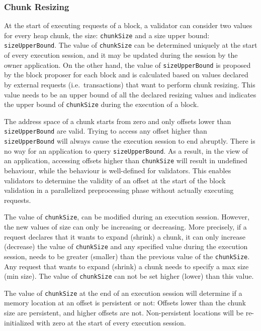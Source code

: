 \subsubsection{Chunk Resizing}\label{subsubsec:ch-resize}

At the start of executing requests of a block, a validator can consider two values for every
heap chunk, the size: \texttt{chunkSize} and a size upper bound: \texttt{sizeUpperBound}. The value of
\texttt{chunkSize} can be determined uniquely at the start of
every execution session, and it may be updated during the session by the owner application. On the other hand,
the value of \texttt{sizeUpperBound} is proposed by the block proposer for each block and is calculated based on values
declared by external requests (i.e.\ transactions) that want to perform chunk resizing. This value needs to be
an upper bound of all the declared resizing values and indicates the upper bound of \texttt{chunkSize} during the
execution of a block.

The address space of a chunk starts from zero and only offsets lower than \texttt{sizeUpperBound} are valid. Trying to
access any offset higher than \texttt{sizeUpperBound} will always cause the execution session to end abruptly. There
is no way for an application to query \texttt{sizeUpperBound}. As a result, in the view of an application,
accessing offsets higher than \texttt{chunkSize} will result in undefined behaviour, while the behaviour is
well-defined for validators.
This enables validators to determine the validity of an offset at the start of the block validation in a parallelized
preprocessing phase without actually executing requests.

The value of \texttt{chunkSize}, can be modified during an execution session. However, the new values of size can
only be increasing or decreasing. More precisely, if a request declares that it wants to expand (shrink) a chunk, it
can only increase (decrease) the value of \texttt{chunkSize} and any specified value during the execution
session, needs to be greater (smaller) than the previous value of the \texttt{chunkSize}. Any request that wants to
expand (shrink) a chunk needs to specify a max size (min size). The value of \texttt{chunkSize} can not be set higher
(lower) than this value.

The value of \texttt{chunkSize} at the end of an execution session will determine if a memory location at an
offset is persistent or not: Offsets lower than the chunk size are persistent, and higher offsets are not.
Non-persistent locations will be re-initialized with zero at the start of every execution session.

